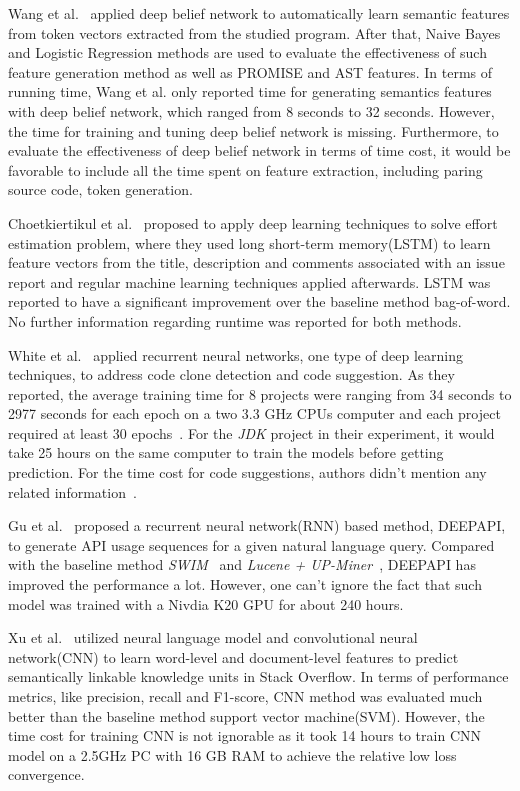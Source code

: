  Wang et al.~\cite{wang2016automatically} applied deep belief network to automatically
 learn semantic features from token vectors extracted from the studied program. After
 that, Naive Bayes and Logistic Regression methods are used to evaluate the effectiveness
 of such feature generation method as well as PROMISE and AST features. In terms of
 running time, Wang et al. only reported time for generating semantics features with deep belief network, which
 ranged from 8 seconds to 32 seconds. However, the time for training and tuning deep belief network is
 missing. Furthermore, to evaluate the effectiveness of deep belief network in terms of time cost, 
 it would be favorable to include all the time spent on feature extraction, including
 paring source code, token generation.
 
 Choetkiertikul et al.~\cite{choetkiertikul2016deep} proposed to apply deep learning techniques
 to solve effort estimation problem, where they used long short-term memory(LSTM) to learn
 feature vectors from the title, description and comments associated with an issue report and
 regular machine learning techniques applied afterwards. LSTM was reported to have a 
 significant improvement over the baseline method bag-of-word. No further information regarding
 runtime was reported for both methods.
 
 White et al.~\cite{white2015toward, white2016deep} applied
 recurrent neural networks, one type of  deep learning techniques, 
 to address code clone detection and code suggestion. As they reported,
 the average training time for 8 projects were ranging from 34 seconds
  to 2977 seconds for each epoch on a two 3.3 GHz
 CPUs computer and each project required at least 30 epochs~\cite{white2016deep}.
 For the {\it JDK} project in their experiment, it would take 25 hours 
 on the same computer to train the models before getting prediction.
 For the time cost for code suggestions, authors didn't mention any related information~\cite{white2015toward}.

Gu et al.~\cite{gu2016deep} proposed  a recurrent neural network(RNN)
 based method, D{\scriptsize EEP}API, to generate API usage sequences for a given natural language query. 
 Compared with the baseline method {\it SWIM}~\cite{raghothaman2016swim} and 
 {\it Lucene + UP-Miner}~\cite{wang2013mining},  D{\scriptsize EEP}API has improved the performance a lot.
 However, one can't ignore the fact that such model was trained with a Nivdia K20 GPU for about 240 hours.
 
 Xu et al.~\cite{xu2016predicting} utilized neural language model and  
 convolutional neural network(CNN) to  learn word-level and document-level features to
 predict semantically linkable knowledge units in Stack Overflow. 
 In terms of performance metrics, like precision, recall and F1-score,
 CNN method was evaluated much better than 
 the baseline method support vector machine(SVM). 
 However, the time cost for training CNN is not ignorable as it took
 14 hours to train CNN model on a 2.5GHz PC with 16 GB RAM 
 to achieve the relative low loss convergence.
 
